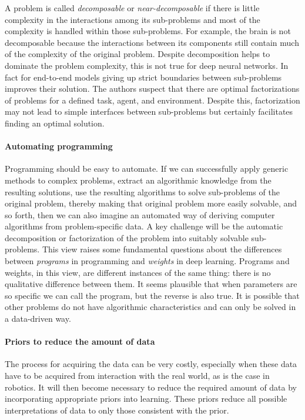 A problem is called \emph{decomposable} or \emph{near-decomposable} if
there is little complexity in the interactions among its sub-problems
and most of the complexity is handled within those sub-problems. For
example, the brain is not decomposable because the interactions between
its components still contain much of the complexity of the original
problem. Despite decomposition helps to dominate the problem complexity,
this is not true for deep neural networks. In fact for end-to-end models
giving up strict boundaries between sub-problems improves their
solution. The authors suspect that there are optimal factorizations of
problems for a defined task, agent, and environment. Despite this,
factorization may not lead to simple interfaces between sub-problems but
certainly facilitates finding an optimal solution.

\paragraph{Automating programming}

Programming should be easy to automate. If we can successfully apply
generic methods to complex problems, extract an algorithmic knowledge
from the resulting solutions, use the resulting algorithms to solve
sub-problems of the original problem, thereby making that original
problem more easily solvable, and so forth, then we can also imagine an
automated way of deriving computer algorithms from problem-specific
data. A key challenge will be the automatic decomposition or
factorization of the problem into suitably solvable sub-problems. This
view raises some fundamental questions about the differences between
\emph{programs} in programming and \emph{weights} in deep learning.
Programs and weights, in this view, are different instances of the same
thing: there is no qualitative difference between them. It seems
plausible that when parameters are so specific we can call the program,
but the reverse is also true. It is possible that other problems do not
have algorithmic characteristics and can only be solved in a data-driven
way.

\paragraph{Priors to reduce the amount of data}

The process for acquiring the data can be very costly, especially when
these data have to be acquired from interaction with the real world, as
is the case in robotics. It will then become necessary to reduce the
required amount of data by incorporating appropriate priors into
learning. These priors reduce all possible interpretations of data to
only those consistent with the prior.

